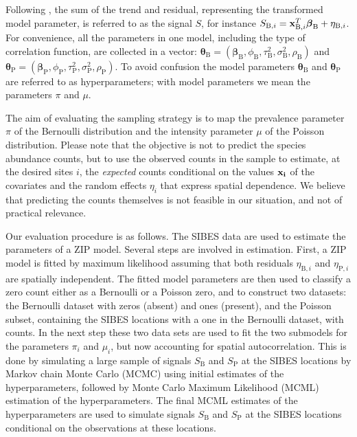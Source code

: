 \documentclass[review]{elsarticle}
\begin{document}
Following \citet{diggle2007}, the sum of the trend and residual, representing the transformed model parameter, is referred to as the signal $S$, for instance $S_{\mathrm{B},i}= \mathbf{x}_{\mathrm{B},i}^{T}\boldsymbol{\beta}_{\rm{B}} + \eta_{\mathrm{B},i}$. For convenience, all the parameters in one model, including the type of correlation function, are collected in  a vector: $\boldsymbol{\theta}_{\mathrm{B}}=(\boldsymbol{\beta}_{\mathrm{B}}, \phi_{\mathrm{B}}, \tau_{\mathrm{B}}^2, \sigma_{\mathrm{B}}^2, \rho_{\mathrm{B}})$ and $\boldsymbol{\theta}_{\mathrm{P}}=(\boldsymbol{\beta}_{\mathrm{P}}, \phi_{\mathrm{P}}, \tau_{\mathrm{P}}^2, \sigma_{\mathrm{P}}^2, \rho_{\mathrm{P}})$. To avoid confusion the model parameters $\boldsymbol{\theta}_{\mathrm{B}}$ and $\boldsymbol{\theta}_{\mathrm{P}}$ are referred to as hyperparameters; with model parameters we mean the parameters $\pi$ and $\mu$.

The aim of evaluating the sampling strategy is to map the prevalence parameter $\pi$ of the Bernoulli distribution and the intensity parameter $\mu$ of the Poisson distribution. Please note that the objective is not to predict the species abundance counts, but to use the observed counts in the sample to estimate, at the desired sites $i$, the \emph{expected} counts conditional on the values $\bf{x}_i$ of the covariates and the random effects $\eta_i$ that express spatial dependence.
We believe that predicting the counts themselves is not feasible in our situation, and not of practical relevance.

Our evaluation procedure is as follows. The SIBES data are used to estimate the parameters of a ZIP model. Several steps are involved in estimation. First, a ZIP model is fitted by maximum likelihood assuming that both residuals $\eta_{\mathrm{B},i}$ and $\eta_{\mathrm{P},i}$ are spatially independent. The fitted model parameters are then used to classify a zero count either as a Bernoulli or a Poisson zero, and to construct two datasets: the Bernoulli dataset with zeros (absent) and ones (present), and the Poisson subset, containing the SIBES locations with a one in the Bernoulli dataset, with counts. In the next step these two data sets are used to fit the two submodels for the parameters $\pi_i$ and $\mu_i$, but now accounting for spatial autocorrelation. This is done by simulating a large sample of signals $S_{\mathrm{B}}$ and $S_{\mathrm{P}}$ at the SIBES locations by Markov chain Monte Carlo (MCMC) using initial estimates of the hyperparameters, followed by Monte Carlo Maximum Likelihood (MCML) estimation of the hyperparameters. The final MCML estimates of the hyperparameters are used to simulate signals $S_{\mathrm{B}}$ and $S_{\mathrm{P}}$ at the SIBES locations conditional on the observations at these locations.
\end{document}
